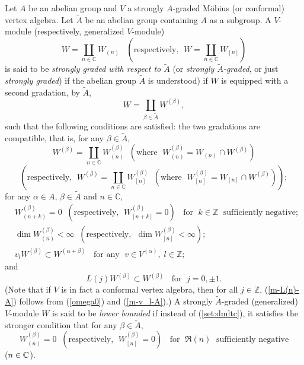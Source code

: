 \documentclass[12pt]{article}
\begin{document}
\begin{defi}\label{def:dgw}{\rm
Let $A$ be an abelian group and $V$ a strongly $A$-graded M\"obius (or
conformal)
vertex algebra. Let $\tilde A$ be an abelian group containing $A$ as a
subgroup. A $V$-module (respectively, generalized $V$-module)
\[
W=\coprod_{n\in{\mathbb C}} W_{(n)} \;\;\;(\mbox{respectively, }\;
W=\coprod_{n\in{\mathbb C}} W_{[n]})
\]
is said to be {\em strongly graded with respect to $\tilde A$} (or
{\em strongly $\tilde A$-graded}, or just {\em strongly graded}) if
the abelian group $\tilde A$ is understood) if $W$ is equipped with a
second gradation, by $\tilde A$,
\begin{equation}\label{2ndgrd}
W=\coprod _{\beta \in \tilde A} W^{(\beta)},
\end{equation}
such that the following conditions are satisfied: the two gradations
are compatible, that is, for any $\beta \in \tilde A$,
\[
W^{(\beta)}=\coprod_{n\in {\mathbb C}} W^{(\beta)}_{(n)} \;\;(\mbox{where }\;
W^{(\beta)}_{(n)}=W_{(n)}\cap W^{(\beta)})
\]
\[
(\mbox{respectively, }\;
W^{(\beta)}=\coprod_{n\in {\mathbb C}} W^{(\beta)}_{[n]} \;\;(\mbox{where }\;
W^{(\beta)}_{[n]}=W_{[n]}\cap W^{(\beta)}));
\]
for any $\alpha\in A$, $\beta\in \tilde A$ and $n\in {\mathbb C}$,
\begin{eqnarray}
&W^{(\beta)}_{(n+k)}=0 \;\; (\mbox{respectively, } \; W^{(\beta)}_{[n+k]}=0)
\;\;\mbox{ for }\;k\in {\mathbb Z}\;\mbox{ sufficiently
negative};&\label{set:dmltc}\\
&\dim W^{(\beta)}_{(n)} <\infty \;\; (\mbox{respectively, } \;
\dim W^{(\beta)}_{[n]} <\infty);&\label{set:dmfin}\\
&v_l W^{(\beta)} \subset W^{(\alpha+\beta)}\;\;\mbox{ for any }\;v\in
V^{(\alpha)},\;l\in {\mathbb Z};&\label{m-v_l-A}
\end{eqnarray}
and
\begin{equation}\label{m-L(n)-A}
L(j)W^{(\beta)} \subset W^{(\beta)}\;\;\mbox{ for }\;j=0,\pm 1.
\end{equation}
(Note that if $V$ is in fact a conformal vertex algebra, then for all
$j\in {\mathbb Z}$, (\ref{m-L(n)-A}) follows {}from (\ref{omega0}) and
(\ref{m-v_l-A}).)  A strongly $\tilde{A}$-graded (generalized) $V$-module $W$
is said to be {\it lower bounded} if instead of (\ref{set:dmltc}),
it satisfies the stronger condition that for any $\beta \in \tilde{A}$,
\begin{equation}\label{set:dmltc-1}
W^{(\beta)}_{(n)}=0 \;\; (\mbox{respectively, } \; W^{(\beta)}_{[n]}=0)
\;\;\mbox{ for }\;\Re{(n)}\;\mbox{ sufficiently
negative}
\end{equation}
($n \in \mathbb{C}$).}
\end{defi}
\end{document}
